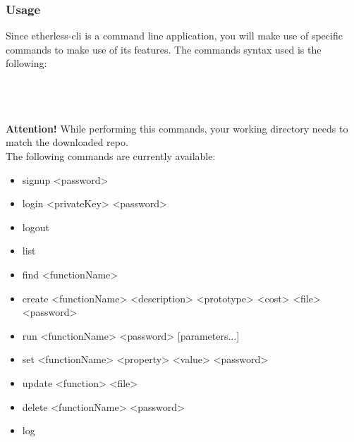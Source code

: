 \subsubsection{Usage}
Since etherless-cli is a command line application, you will make use of specific commands to make use of its features. The commands syntax used is the following:
\\\\\centerline{}\\\\
\textbf{Attention!} While performing this commands, your working directory needs to match the downloaded repo.\\

The following commands are currently available:
\begin{itemize}
	\item signup <password>
	\item login <privateKey> <password>
	\item logout
	\item list
	\item find <functionName>
	\item create <functionName> <description> <prototype> <cost> <file> <password>
	\item run <functionName> <password> [parameters...]
	\item set <functionName> <property> <value> <password>
	\item update <function> <file>
	\item delete <functionName> <password>
	\item log
\end{itemize}

